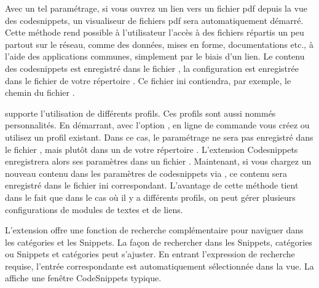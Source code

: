 Avec un tel paramétrage, si vous ouvrez un lien vers un fichier pdf depuis la vue des codesnippets, un visualiseur de fichiers pdf sera automatiquement démarré. Cette méthode rend possible à l'utilisateur l'accès à des fichiers répartis un peu partout sur le réseau, comme des données, mises en forme, documentations etc., à l'aide des applications communes, simplement par le biais d'un lien. Le contenu des codesnippets est enregistré dans le fichier , la configuration est enregistrée dans le fichier  de votre répertoire . Ce fichier ini contiendra, par exemple, le chemin du fichier .


\codeblocks supporte l'utilisation de différents profils. Ces profils sont aussi nommés personnalités. En démarrant, avec l'option , \codeblocks en ligne de commande vous créez ou utilisez un profil existant. Dans ce cas, le paramétrage ne sera pas enregistré dans le fichier , mais plutôt dans un  de votre répertoire . L'extension Codesnippets enregistrera alors ses paramètres dans un fichier . Maintenant, si vous chargez un nouveau contenu  dans les paramètres de codesnippets via , ce contenu sera enregistré dans le fichier ini correspondant. L'avantage de cette méthode tient dans le fait que dans le cas où il y a différents profils, on peut gérer plusieurs configurations de modules de textes et de liens.

L'extension offre une fonction de recherche complémentaire pour naviguer dans les catégories et les Snippets. La façon de rechercher dans les Snippets, catégories ou Snippets et catégories peut s'ajuster. En entrant l'expression de recherche requise, l'entrée correspondante est automatiquement sélectionnée dans la vue. La  affiche une fenêtre CodeSnippets typique.



